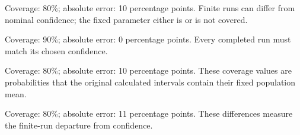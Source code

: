 \begin{answeroptions}
\item Coverage: 80\%; absolute error: 10 percentage points. Finite runs can differ from nominal confidence; the fixed parameter either is or is not covered.
\item Coverage: 90\%; absolute error: 0 percentage points. Every completed run must match its chosen confidence.
\item Coverage: 80\%; absolute error: 10 percentage points. These coverage values are probabilities that the original calculated intervals contain their fixed population mean.
\item Coverage: 80\%; absolute error: 11 percentage points. These differences measure the finite-run departure from confidence.
\end{answeroptions}
\clearpage
